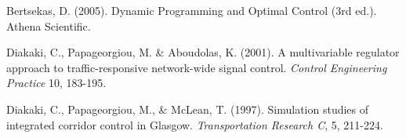 \documentclass[11pt]{article}
\begin{document}
\begin{thebibliography}{9}
Bertsekas, D. (2005). Dynamic Programming and Optimal Control (3rd ed.). Athena Scientific.

Diakaki, C., Papageorgiou, M. \& Aboudolas, K. (2001).
A multivariable regulator approach to traffic-responsive network-wide signal control.
\textit{Control Engineering Practice} 10, 183-195.

Diakaki, C., Papageorgiou, M., \& McLean, T. (1997). Simulation studies of integrated corridor control in Glasgow. 
\textit{Transportation Research C}, 5, 211-224.

\end{thebibliography}

\end{document}

